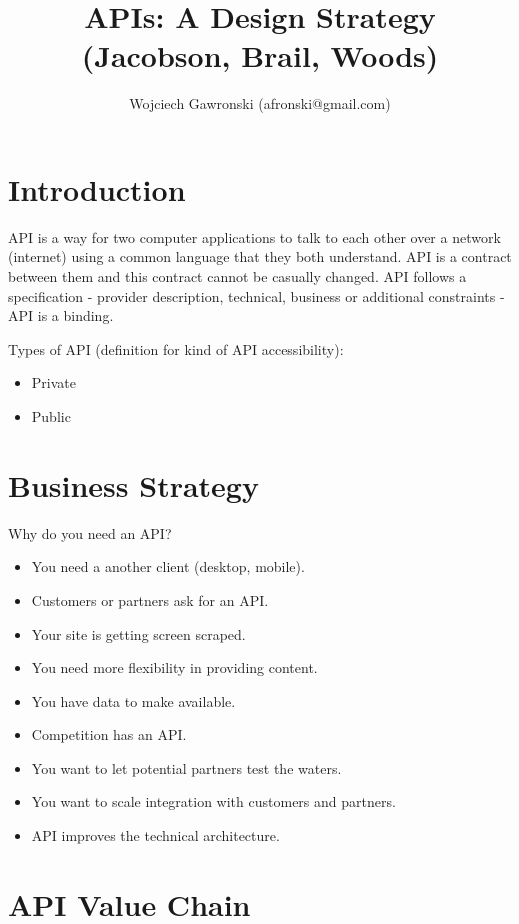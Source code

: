 \documentclass[11pt,a4paper]{article}
\title{APIs: A Design Strategy (Jacobson, Brail, Woods)}
\author{Wojciech Gawronski (afronski@gmail.com)}
\begin{document}
\maketitle
\newpage

\tableofcontents
\newpage

\section{Introduction}

API is a way for two computer applications to talk to each other over a network (internet) using a common language that they both understand. API is a contract between them and this contract cannot be casually changed. API follows a specification - provider description, technical, business or additional constraints - API is a binding.

Types of API (definition for kind of API accessibility):
\begin{itemize}
	\item Private
	\item Public
\end{itemize}

\section{Business Strategy}

Why do you need an API?
\begin{itemize}
	\item You need a another client (desktop, mobile).
	\item Customers or partners ask for an API.
	\item Your site is getting screen scraped.
	\item You need more flexibility in providing content.
	\item You have data to make available.
	\item Competition has an API.
	\item You want to let potential partners test the waters.
	\item You want to scale integration with customers and partners.
	\item API improves the technical architecture.
\end{itemize}

\section{API Value Chain}
\end{document}
